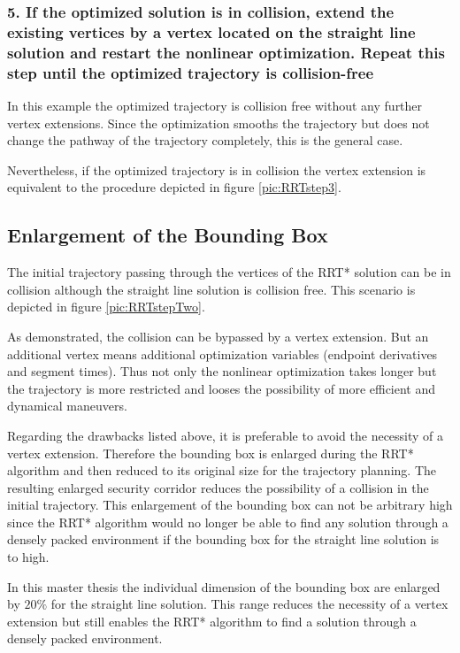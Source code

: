 \subsubsection{5. If the optimized solution is in collision, extend the existing vertices by a vertex located on the straight line solution and restart the nonlinear optimization. Repeat this step until the optimized trajectory is collision-free}
In this example the optimized trajectory is collision free without any further vertex extensions. Since the optimization smooths the trajectory but does not change the pathway of the trajectory completely, this is the general case. \newline

Nevertheless, if the optimized trajectory is in collision the vertex extension is equivalent to the procedure depicted in figure \ref{pic:RRTstep3}.

\subsection{Enlargement of the Bounding Box}\label{sec:enlargementBBX}

The initial trajectory passing through the vertices of the RRT* solution can be in collision although the straight line solution is collision free. This scenario is depicted in figure \ref{pic:RRTstepTwo}. \newline

As demonstrated, the collision can be bypassed by a vertex extension. But an additional vertex means additional optimization variables (endpoint derivatives and segment times). Thus not only the nonlinear optimization takes longer but the trajectory is more restricted and looses the possibility of more efficient and dynamical maneuvers.  \newline

Regarding the drawbacks listed above, it is preferable to avoid the necessity of a vertex extension. Therefore the bounding box is enlarged during the RRT* algorithm and then reduced to its original size for the trajectory planning. The resulting enlarged security corridor reduces the possibility of a collision in the initial trajectory. This enlargement of the bounding box can not be arbitrary high since the RRT* algorithm would no longer be able to find any solution through a densely packed environment if the bounding box for the straight line solution is to high. \newline

In this master thesis the individual dimension of the bounding box are enlarged by $20\%$ for the straight line solution. This range reduces the necessity of a vertex extension but still enables the RRT* algorithm to find a solution through a densely packed environment.
%

